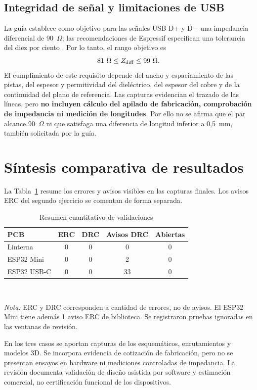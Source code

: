 \documentclass[journal,10pt]{IEEEtran}
\begin{document}
\subsection{Integridad de señal y limitaciones de USB}
La guía establece como objetivo para las señales USB D+ y D$-$ una impedancia diferencial de 90~$\Omega$; las recomendaciones de Espressif especifican una tolerancia del diez por ciento \cite{guia,espressif}. Por lo tanto, el rango objetivo es
\begin{equation}
81\ \Omega \leq Z_{\rm diff}\leq 99\ \Omega.
\end{equation}
El cumplimiento de este requisito depende del ancho y espaciamiento de las pistas, del espesor y permitividad del dieléctrico, del espesor del cobre y de la continuidad del plano de referencia. Las capturas evidencian el trazado de las líneas, pero \textbf{no incluyen cálculo del apilado de fabricación, comprobación de impedancia ni medición de longitudes}. Por ello no se afirma que el par alcance 90~$\Omega$ ni que satisfaga una diferencia de longitud inferior a 0,5~mm, también solicitada por la guía.

\section{Síntesis comparativa de resultados}
La Tabla~\ref{tab:comparativa} resume los errores y avisos visibles en las capturas finales. Los avisos ERC del segundo ejercicio se comentan de forma separada.

\begin{table}[H]
\caption{Resumen cuantitativo de validaciones}
\label{tab:comparativa}
\centering
\footnotesize
\begin{tabular}{@{}lcccc@{}}
\toprule
\textbf{PCB} & \textbf{ERC} & \textbf{DRC} & \textbf{Avisos DRC} & \textbf{Abiertas}\\
\midrule
Linterna & 0 & 0 & 0 & 0\\
ESP32 Mini & 0 & 0 & 2 & 0\\
ESP32 USB-C & 0 & 0 & 33 & 0\\
\bottomrule
\end{tabular}\\[0.5ex]
\parbox{0.97\columnwidth}{\scriptsize \emph{Nota:} ERC y DRC corresponden a cantidad de errores, no de avisos. El ESP32 Mini tiene además 1 aviso ERC de biblioteca. Se registraron pruebas ignoradas en las ventanas de revisión.}
\end{table}

En los tres casos se aportan capturas de los esquemáticos, enrutamientos y modelos 3D. Se incorpora evidencia de cotización de fabricación, pero no se presentan ensayos en hardware ni mediciones controladas de impedancia. La revisión documenta validación de diseño asistida por software y estimación comercial, no certificación funcional de los dispositivos.
\end{document}
